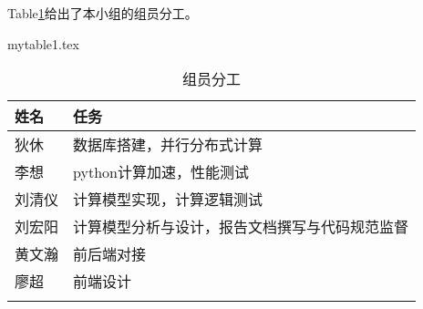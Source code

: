 Table\ref{tab:sys.param}给出了本小组的组员分工。

\begin{filecontents}{mytable1.tex}
  \begin{longtable}{lX}

\hline 姓名 & 任务  \\ \hline

 狄休 & 数据库搭建，并行分布式计算 \\ \hline
 李想 & python计算加速，性能测试  \\ \hline
 刘清仪 & 计算模型实现，计算逻辑测试  \\ \hline
 刘宏阳 & 计算模型分析与设计，报告文档撰写与代码规范监督  \\ \hline
 黄文瀚 & 前后端对接  \\ \hline
 廖超 & 前端设计  \\ \hline


      \caption{组员分工}
  \label{tab:sys.param}
  \end{longtable}
\end{filecontents}
